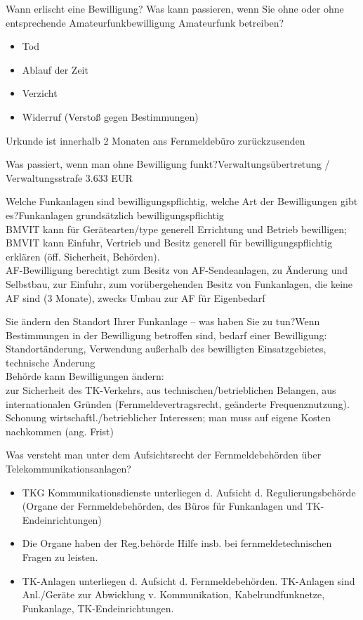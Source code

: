 \documentclass[avery5371,grid,frame,a4paper]{flashcards}
\newcommand{\card}[3]{
  \begin{flashcard}[{\chap} -- #1]{#2}#3\end{flashcard}
}
\begin{document}
\card{09}{Wann erlischt eine Bewilligung? Was kann passieren, wenn Sie ohne oder ohne entsprechende Amateurfunkbewilligung Amateurfunk betreiben?}{\begin{itemize}\itemsep1pt \item Tod \item Ablauf der Zeit \item Verzicht \item Widerruf (Verstoß gegen Bestimmungen) \end{itemize}	Urkunde ist innerhalb 2 Monaten ans Fernmeldebüro zurückzusenden}

\card{10}{Was passiert, wenn man ohne Bewilligung funkt?}{Verwaltungsübertretung / Verwaltungsstrafe 3.633 EUR}

\card{11}{Welche Funkanlagen sind bewilligungspflichtig, welche Art der Bewilligungen gibt es?}{Funkanlagen grundsätzlich bewilligungspflichtig\\ BMVIT kann für Gerätearten/type generell Errichtung und Betrieb bewilligen; BMVIT kann Einfuhr, Vertrieb und Besitz generell für bewilligungspflichtig erklären (öff. Sicherheit, Behörden). \\ AF-Bewilligung berechtigt zum Besitz von AF-Sendeanlagen, zu Änderung und Selbstbau, zur Einfuhr, zum vorübergehenden Besitz von Funkanlagen, die keine AF sind (3 Monate), zwecks Umbau zur AF für Eigenbedarf}

\card{12}{Sie ändern den Standort Ihrer Funkanlage – was haben Sie zu tun?}{Wenn Bestimmungen in der Bewilligung betroffen sind, bedarf einer Bewilligung:\\ Standortänderung,  Verwendung außerhalb des bewilligten Einsatzgebietes, technische Änderung \\
Behörde kann Bewilligungen ändern: \\ zur Sicherheit des TK-Verkehrs, aus technischen/betrieblichen Belangen, aus internationalen Gründen (Fernmeldevertragsrecht, geänderte Frequenznutzung). Schonung wirtschaftl./betrieblicher Interessen; man muss auf eigene Kosten nachkommen (ang. Frist)}

\card{13}{Was versteht man unter dem Aufsichtsrecht der Fernmeldebehörden über Telekommunikationsanlagen?}{\begin{itemize}\itemsep1pt \item TKG Kommunikationsdienste unterliegen d. Aufsicht	d. Regulierungsbehörde (Organe der Fernmeldebehörden, des Büros für Funkanlagen und TK-Endeinrichtungen) \item Die Organe haben der Reg.behörde Hilfe insb. bei 	fernmeldetechnischen Fragen zu leisten. \item	TK-Anlagen unterliegen d. Aufsicht d. 	Fernmeldebehörden. TK-Anlagen sind Anl./Geräte zur Abwicklung v. Kommunikation, 	Kabelrundfunknetze, Funkanlage, TK-Endeinrichtungen. \end{itemize}}
\end{document}
